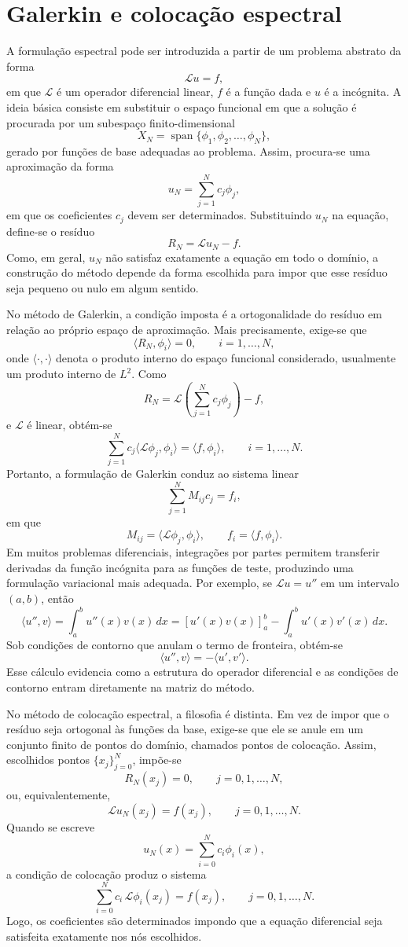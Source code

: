 \section{Galerkin e colocação espectral}

A formulação espectral pode ser introduzida a partir de um problema abstrato da forma
\[
\mathcal{L}u=f,
\]
em que \(\mathcal{L}\) é um operador diferencial linear, \(f\) é a função dada e \(u\) é a incógnita. A ideia básica consiste em substituir o espaço funcional em que a solução é procurada por um subespaço finito-dimensional
\[
X_N=\operatorname{span}\{\phi_1,\phi_2,\dots,\phi_N\},
\]
gerado por funções de base adequadas ao problema. Assim, procura-se uma aproximação da forma
\[
u_N=\sum_{j=1}^{N}c_j\phi_j,
\]
em que os coeficientes \(c_j\) devem ser determinados. Substituindo \(u_N\) na equação, define-se o resíduo
\[
R_N=\mathcal{L}u_N-f.
\]
Como, em geral, \(u_N\) não satisfaz exatamente a equação em todo o domínio, a construção do método depende da forma escolhida para impor que esse resíduo seja pequeno ou nulo em algum sentido.

No método de Galerkin, a condição imposta é a ortogonalidade do resíduo em relação ao próprio espaço de aproximação. Mais precisamente, exige-se que
\[
\langle R_N,\phi_i\rangle=0,
\qquad i=1,\dots,N,
\]
onde \(\langle\cdot,\cdot\rangle\) denota o produto interno do espaço funcional considerado, usualmente um produto interno de \(L^2\). Como
\[
R_N=\mathcal{L}\left(\sum_{j=1}^{N}c_j\phi_j\right)-f,
\]
e \(\mathcal{L}\) é linear, obtém-se
\[
\sum_{j=1}^{N}c_j\langle \mathcal{L}\phi_j,\phi_i\rangle
=
\langle f,\phi_i\rangle,
\qquad i=1,\dots,N.
\]
Portanto, a formulação de Galerkin conduz ao sistema linear
\[
\sum_{j=1}^{N}M_{ij}c_j=f_i,
\]
em que
\[
M_{ij}=\langle \mathcal{L}\phi_j,\phi_i\rangle,
\qquad
f_i=\langle f,\phi_i\rangle.
\]
Em muitos problemas diferenciais, integrações por partes permitem transferir derivadas da função incógnita para as funções de teste, produzindo uma formulação variacional mais adequada. Por exemplo, se \(\mathcal{L}u=u''\) em um intervalo \((a,b)\), então
\[
\langle u'',v\rangle
=
\int_a^b u''(x)v(x)\,dx
=
\left[u'(x)v(x)\right]_a^b-
\int_a^b u'(x)v'(x)\,dx.
\]
Sob condições de contorno que anulam o termo de fronteira, obtém-se
\[
\langle u'',v\rangle=-\langle u',v'\rangle.
\]
Esse cálculo evidencia como a estrutura do operador diferencial e as condições de contorno entram diretamente na matriz do método.

No método de colocação espectral, a filosofia é distinta. Em vez de impor que o resíduo seja ortogonal às funções da base, exige-se que ele se anule em um conjunto finito de pontos do domínio, chamados pontos de colocação. Assim, escolhidos pontos \(\{x_j\}_{j=0}^{N}\), impõe-se
\[
R_N(x_j)=0,
\qquad j=0,1,\dots,N,
\]
ou, equivalentemente,
\[
\mathcal{L}u_N(x_j)=f(x_j),
\qquad j=0,1,\dots,N.
\]
Quando se escreve
\[
u_N(x)=\sum_{i=0}^{N}c_i\phi_i(x),
\]
a condição de colocação produz o sistema
\[
\sum_{i=0}^{N}c_i\,\mathcal{L}\phi_i(x_j)=f(x_j),
\qquad j=0,1,\dots,N.
\]
Logo, os coeficientes são determinados impondo que a equação diferencial seja satisfeita exatamente nos nós escolhidos.

